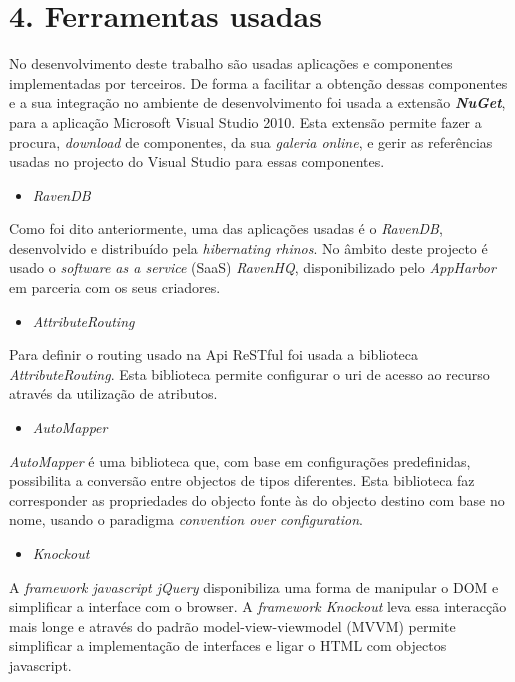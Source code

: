 \documentclass[]{article}
\begin{document}
\section{4. Ferramentas usadas}
No desenvolvimento deste trabalho são usadas aplicações e componentes implementadas por terceiros. De forma a facilitar a obtenção dessas componentes e a sua integração no ambiente de desenvolvimento foi usada a extensão \emph{\textbf{NuGet}}, para a aplicação Microsoft Visual Studio 2010. Esta extensão permite fazer a procura, \emph{download} de componentes, da sua \emph{galeria online}, e gerir as referências usadas no projecto do Visual Studio para essas componentes.
\begin{itemize}
\item
\emph{RavenDB}\cite{ravendb}
\end{itemize}
Como foi dito anteriormente, uma das aplicações usadas é o \emph{RavenDB}\cite{ravendb}, desenvolvido e distribuído pela \emph{hibernating rhinos}\cite{hibrhinos}. No âmbito deste projecto é usado o \emph{software as a service} (SaaS) \emph{RavenHQ}\cite{ravenhq}, disponibilizado pelo \emph{AppHarbor}\cite{appharbor} em parceria com os seus criadores.
\begin{itemize}
\item
\emph{AttributeRouting}\cite{attributerouting}
\end{itemize}
Para definir o routing usado na Api ReSTful foi usada a biblioteca
\emph{AttributeRouting}\cite{attributerouting}. Esta biblioteca permite configurar o uri de acesso ao recurso através da utilização de atributos.
\begin{itemize}
\item
\emph{AutoMapper}\cite{automapper}
\end{itemize}
\emph{AutoMapper}\cite{automapper} é uma biblioteca que, com base em configurações predefinidas, possibilita a conversão entre objectos de tipos diferentes. Esta biblioteca faz corresponder as propriedades do objecto fonte às do objecto destino com base no nome,  usando o paradigma \emph{convention over configuration}.
\begin{itemize}
\item
\emph{Knockout}\cite{knockout}
\end{itemize}
A \emph{framework javascript jQuery}\cite{jquery} disponibiliza uma forma de manipular o DOM e simplificar a interface com o browser. A \emph{framework Knockout}\cite{knockout} leva essa interacção mais longe e através do padrão model-view-viewmodel (MVVM) permite simplificar a implementação de interfaces e ligar o HTML com objectos javascript.\\
\end{document}
